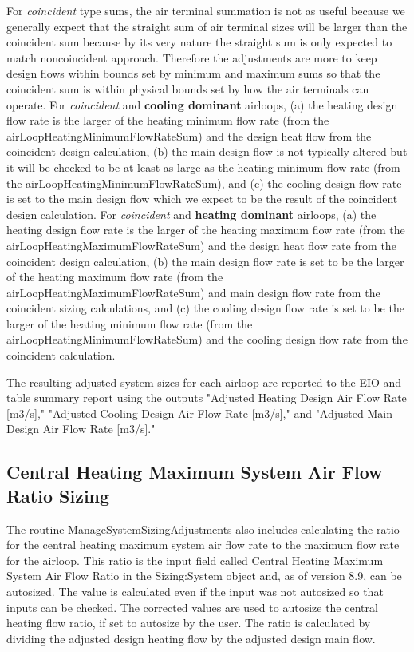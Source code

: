  For \emph{coincident} type sums, the air terminal summation is not as useful because we generally expect that the straight sum of air terminal sizes will be larger than the coincident sum because by its very nature the straight sum is only expected to match noncoincident approach.  Therefore the adjustments are more to keep design flows within bounds set by minimum and maximum sums so that the coincident sum is within physical bounds set by how the air terminals can operate.  For \emph{coincident} and \textbf{cooling dominant} airloops,  (a) the heating design flow rate is the larger of the heating minimum flow rate (from the airLoopHeatingMinimumFlowRateSum) and the design heat flow from the coincident design calculation, (b) the main design flow is not typically altered but it will be checked to be at least as large as the heating minimum flow rate (from the airLoopHeatingMinimumFlowRateSum), and (c) the cooling design flow rate is set to the main design flow which we expect to be the result of the coincident design calculation.  For \emph{coincident} and \textbf{heating dominant} airloops, (a) the heating design flow rate is the larger of the heating maximum flow rate (from the airLoopHeatingMaximumFlowRateSum) and the design heat flow rate from the coincident design calculation, (b) the main design flow rate is set to be the larger of the heating maximum flow rate (from the airLoopHeatingMaximumFlowRateSum) and main design flow rate from the coincident sizing calculations, and (c) the cooling design flow rate is set to be the larger of the heating minimum flow rate (from the airLoopHeatingMinimumFlowRateSum) and the cooling design flow rate from the coincident calculation. 
 
 The resulting adjusted system sizes for each airloop are reported to the EIO and table summary report using the outputs "Adjusted Heating Design Air Flow Rate [m3/s]," "Adjusted Cooling Design Air Flow Rate [m3/s]," and "Adjusted Main Design Air Flow Rate [m3/s]."

\subsection{Central Heating Maximum System Air Flow Ratio Sizing}\label{central-heating-maximum-system-air-flow-ratio-sizing}

The routine ManageSystemSizingAdjustments also includes calculating the ratio for the central heating maximum system air flow rate to the maximum flow rate for the airloop.  This ratio is the input field called Central Heating Maximum System Air Flow Ratio in the Sizing:System object and, as of version 8.9, can be autosized.  The value is calculated even if the input was not autosized so that inputs can be checked.  The corrected values are used to autosize the central heating flow ratio, if set to autosize by the user. The ratio is calculated by dividing the adjusted design heating flow by the adjusted design main flow. 

